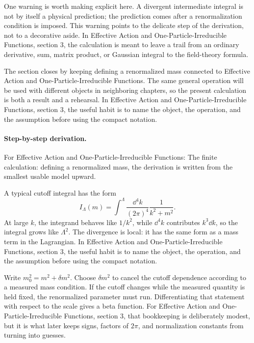 One warning is worth making explicit here.  A divergent intermediate integral is not by itself a physical prediction; the prediction comes after a renormalization condition is imposed.  This warning points to the delicate step of the derivation, not to a decorative aside.  In Effective Action and One-Particle-Irreducible Functions, section 3, the calculation is meant to leave a trail from an ordinary derivative, sum, matrix product, or Gaussian integral to the field-theory formula.

The section closes by keeping defining a renormalized mass connected to Effective Action and One-Particle-Irreducible Functions.  The same general operation will be used with different objects in neighboring chapters, so the present calculation is both a result and a rehearsal.  In Effective Action and One-Particle-Irreducible Functions, section 3, the useful habit is to name the object, the operation, and the assumption before using the compact notation.



\paragraph{Step-by-step derivation.}

For Effective Action and One-Particle-Irreducible Functions: The finite calculation: defining a renormalized mass, the derivation is written from the smallest usable model upward.

A typical cutoff integral has the form
\[
  I_\Lambda(m)=\int^{\Lambda}\frac{\dd^4k}{(2\pi)^4}\frac{1}{k^2+m^2}.
\]
At large \(k\), the integrand behaves like \(1/k^2\), while \(\dd^4k\) contributes \(k^3\dd k\), so the integral grows like \(\Lambda^2\).  The divergence is local: it has the same form as a mass term in the Lagrangian.  In Effective Action and One-Particle-Irreducible Functions, section 3, the useful habit is to name the object, the operation, and the assumption before using the compact notation.

Write \(m_0^2=m^2+\delta m^2\).  Choose \(\delta m^2\) to cancel the cutoff dependence according to a measured mass condition.  If the cutoff changes while the measured quantity is held fixed, the renormalized parameter must run.  Differentiating that statement with respect to the scale gives a beta function.  For Effective Action and One-Particle-Irreducible Functions, section 3, that bookkeeping is deliberately modest, but it is what later keeps signs, factors of \(2\pi\), and normalization constants from turning into guesses.

